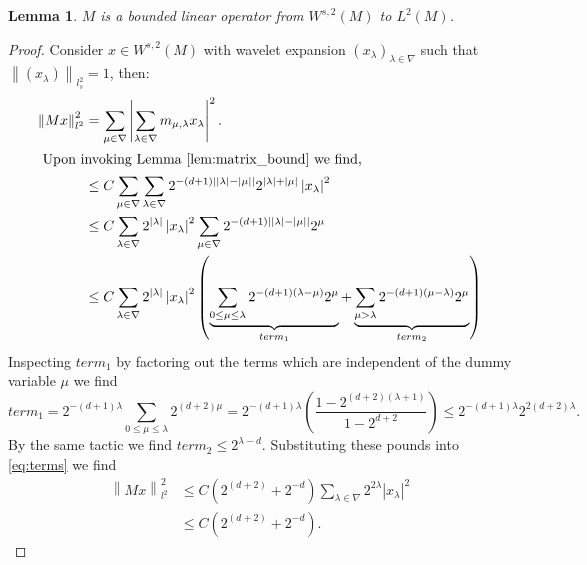 \documentclass[12pt]{amsart}
\newtheorem{lemma}{Lemma}
\newcommand{\card}[1]{{\lvert#1\rvert}}
\newcommand{\abs}[1]{\ensuremath{\left\lvert #1\right\rvert}}
\newcommand{\norm}[1]{\ensuremath{\left\lVert #1\right\rVert}}
\begin{document}
\begin{lemma}
	$M$ is a bounded linear operator from $W^{s,2}(M)$ to $L^2(M)$.
\end{lemma}
\begin{proof}
	Consider $x \in W^{s,2}(M)$ with wavelet expansion $(x_\lambda)_{\lambda \in \nabla}$ such that $\norm{(x_\lambda)}_{l_s^2} = 1$, then:
	\begin{align}
		\norm{Mx}_{l^2}^2   &=    \sum_{\mu \in \nabla} \abs{ \sum_{\lambda \in \nabla} m_{\mu,\lambda} x_{\lambda} }^2. \nonumber \\
		\intertext{ Upon invoking Lemma \ref{lem:matrix_bound} we find,}
							&\leq C\sum_{\mu \in \nabla} \sum_{\lambda \in \nabla} 2^{-(d+1)\abs{\card{\lambda} - \card{\mu}}} 2^{\card{\lambda}+\card{\mu}} \abs{x_\lambda}^2 \nonumber \\
							&\leq C\sum_{\lambda \in \nabla} 2^{\card{\lambda}} \abs{x_\lambda}^2 \sum_{\mu \in \nabla} 2^{-(d+1)\abs{\card{\lambda}-\card{\mu}}}2^\mu \nonumber \\
							&\leq C\sum_{\lambda \in \nabla}  2^{\card{\lambda}} \abs{x_\lambda}^2 \left( \underbrace{\sum_{0\leq\mu\leq\lambda} 2^{-(d+1)(\lambda - \mu)}2^{\mu}}_{term_1} + \underbrace{\sum_{\mu > \lambda} 2^{-(d+1)(\mu-\lambda)}2^{\mu} }_{term_2} \right) \label{eq:terms}
		\end{align}
		Inspecting $term_1$ by factoring out the terms which are independent of the dummy variable $\mu$ we find
		\[
			term_1 = 2^{-(d+1) \lambda }\sum_{0\leq\mu\leq\lambda} 2^{(d+2) \mu} = 2^{-(d+1) \lambda} \left(  \frac{ 1-2^{(d+2)(\lambda + 1)} }{1 - 2^{d+2} } \right) \leq 2^{-(d+1) \lambda} 2^{2(d+2)\lambda}.
		\]
		By the same tactic we find $term_2 \leq 2^{\lambda - d}$.  Substituting these pounds into \eqref{eq:terms} we find
		\begin{align*}	
			\norm{Mx}_{l^2}^2 	&\leq C(2^{(d+2)}+2^{-d}) \sum_{\lambda \in \nabla} 2^{2\lambda} \abs{x_{\lambda}}^2 \\
							&\leq C(2^{(d+2)}+2^{-d}).
		\end{align*}
\end{proof}
\end{document}
